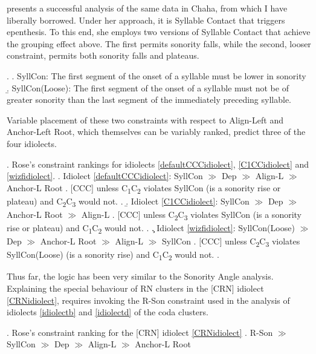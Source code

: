 \documentclass[12pt]{article}
\begin{document}
\citet{rose.2000} presents a successful analysis of the same data in Chaha, from which I have liberally borrowed. Under her approach, it is Syllable Contact that triggers epenthesis. To this end, she employs two versions of Syllable Contact that achieve the grouping effect above. The first permits sonority falls, while the second, looser constraint, permits both sonority falls and plateaus.

\ex. \a. {\sc SyllCon}: The first segment of the onset of a syllable must be lower in sonority 
     \b. {\sc SyllCon(Loose}): The first segment of the onset of a syllable must not be of greater sonority than the last segment of the immediately preceding syllable.

Variable placement of these two constraints with respect to {\sc Align-Left} and {\sc Anchor-Left Root}, which themselves can be variably ranked, predict three of the four idiolects.

\ex. Rose's constraint rankings for idiolects \ref{defaultCCCidiolect}, \ref{C1CCidiolect} and \ref{wizfidiolect}.
    \a. Idiolect \ref{defaultCCCidiolect}: {\sc SyllCon} $\gg$ {\sc Dep} $\gg$ {\sc Align-L} $\gg$ {\sc Anchor-L Root}
          \a. $[$CCC$]$ unless C\textsubscript{1}C\textsubscript{2} violates {\sc SyllCon}
               (is a sonority rise or plateau) and C\textsubscript{2}C\textsubscript{3} would not.
          \z.
     \b. Idiolect \ref{C1CCidiolect}: {\sc SyllCon} $\gg$ {\sc Dep} $\gg$ {\sc Anchor-L Root} $\gg$ {\sc Align-L} 
          \a.  $[$CCC$]$ unless C\textsubscript{2}C\textsubscript{3} violates {\sc SyllCon}
                (is a sonority rise or plateau) and C\textsubscript{1}C\textsubscript{2} would not.
          \z.
     \c. Idiolect \ref{wizfidiolect}: {\sc SyllCon(Loose)} $\gg$ {\sc Dep} $\gg$ {\sc Anchor-L Root} $\gg$ {\sc Align-L} $\gg$ {\sc SyllCon}
          \a. $[$CCC$]$ unless C\textsubscript{2}C\textsubscript{3} violates {\sc SyllCon(Loose)} 
                (is a sonority rise) and C\textsubscript{1}C\textsubscript{2} would not.
          \z.

Thus far, the logic has been very similar to the {\sc Sonority Angle} analysis. Explaining the special behaviour of RN clusters in the [CRN] idiolect \ref{CRNidiolect}, requires invoking the {\sc *R-Son} constraint used in the analysis of idiolects \ref{idiolectb} and \ref{idiolectd} of the coda clusters.

\ex. Rose's constraint ranking for the [CRN] idiolect \ref{CRNidiolect}
     \a. {\sc *R-Son} $\gg$ {\sc SyllCon} $\gg$ {\sc Dep} $\gg$ {\sc Align-L} $\gg$ {\sc Anchor-L Root}
\end{document}
